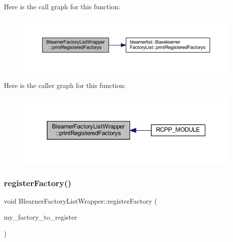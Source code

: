 Here is the call graph for this function\+:\nopagebreak
\begin{figure}[H]
\begin{center}
\leavevmode
\includegraphics[width=350pt]{class_blearner_factory_list_wrapper_a53be3f4546c996827d03db1f637d2066_cgraph}
\end{center}
\end{figure}
Here is the caller graph for this function\+:\nopagebreak
\begin{figure}[H]
\begin{center}
\leavevmode
\includegraphics[width=344pt]{class_blearner_factory_list_wrapper_a53be3f4546c996827d03db1f637d2066_icgraph}
\end{center}
\end{figure}
\mbox{\label{class_blearner_factory_list_wrapper_a672ddef75775ba1d5f930a20a9027247}} 
\subsubsection{\texorpdfstring{register\+Factory()}{registerFactory()}}
{\footnotesize\ttfamily void Blearner\+Factory\+List\+Wrapper\+::register\+Factory (\begin{DoxyParamCaption}\item[{\mbox{\hyperlink{class_baselearner_factory_wrapper}{Baselearner\+Factory\+Wrapper}} \&}]{my\+\_\+factory\+\_\+to\+\_\+register }\end{DoxyParamCaption})\hspace{0.3cm}{\ttfamily [inline]}}

